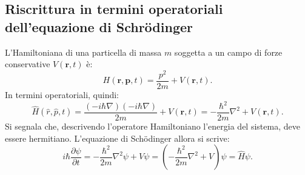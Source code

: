 \documentclass[a4paper,11pt]{report}
\begin{document}
\subsection{Riscrittura in termini operatoriali dell'equazione di Schrödinger}
L'Hamiltoniana di una particella di massa $m$ soggetta a un campo di forze conservative $V(\bm{r}, t)$ è:
\begin{equation}
    H(\bm{r}, \bm{p}, t) = \frac{p^2}{2m} + V(\bm{r}, t).
\end{equation}
In termini operatoriali, quindi:
\begin{equation}
    \hat{H}(\hat{r}, \hat{p}, t) = \frac{(-i\hbar \nabla)(-i\hbar \nabla)}{2m} + V(\bm{r}, t) = -\frac{\hbar^2}{2m}\nabla^2 + V(\bm{r}, t).
\end{equation}
Si segnala che, descrivendo l'operatore Hamiltoniano l'energia del sistema, deve essere hermitiano. L'equazione di Schödinger allora si scrive:
\begin{equation}
    i\hbar \frac{\partial \psi}{\partial t} = -\frac{\hbar^2}{2m}\nabla^2\psi + V\psi = \left(-\frac{\hbar^2}{2m}\nabla^2 + V\right)\psi = \hat{H}\psi.
\end{equation}
\end{document}
